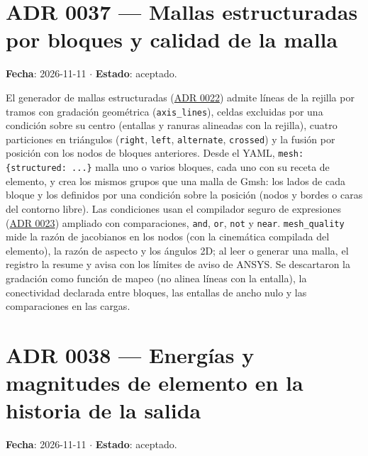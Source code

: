 \documentclass[11pt,oneside]{report}
\begin{document}
\section{ADR 0037 --- Mallas estructuradas por bloques y calidad de la malla}
\label{adr:0037}

\textbf{Fecha}: 2026-11-11 \ensuremath{\cdot} \textbf{Estado}: aceptado.

El generador de mallas estructuradas (\hyperref[adr:0022]{ADR 0022}) admite líneas de la rejilla por tramos con gradación geométrica (\texttt{axis\_lines}), celdas excluidas por una condición sobre su centro (entallas y ranuras alineadas con la rejilla), cuatro particiones en triángulos (\texttt{right}, \texttt{left}, \texttt{alternate}, \texttt{crossed}) y la fusión por posición con los nodos de bloques anteriores. Desde el YAML, \texttt{mesh: \{structured: .\allowbreak{}.\allowbreak{}.\allowbreak{}\}} malla uno o varios bloques, cada uno con su receta de elemento, y crea los mismos grupos que una malla de Gmsh: los lados de cada bloque y los definidos por una condición sobre la posición (nodos y bordes o caras del contorno libre). Las condiciones usan el compilador seguro de expresiones (\hyperref[adr:0023]{ADR 0023}) ampliado con comparaciones, \texttt{and}, \texttt{or}, \texttt{not} y \texttt{near}. \texttt{mesh\_quality} mide la razón de jacobianos en los nodos (con la cinemática compilada del elemento), la razón de aspecto y los ángulos 2D; al leer o generar una malla, el registro la resume y avisa con los límites de aviso de ANSYS. Se descartaron la gradación como función de mapeo (no alinea líneas con la entalla), la conectividad declarada entre bloques, las entallas de ancho nulo y las comparaciones en las cargas.

\section{ADR 0038 --- Energías y magnitudes de elemento en la historia de la salida}
\label{adr:0038}

\textbf{Fecha}: 2026-11-11 \ensuremath{\cdot} \textbf{Estado}: aceptado.
\end{document}
